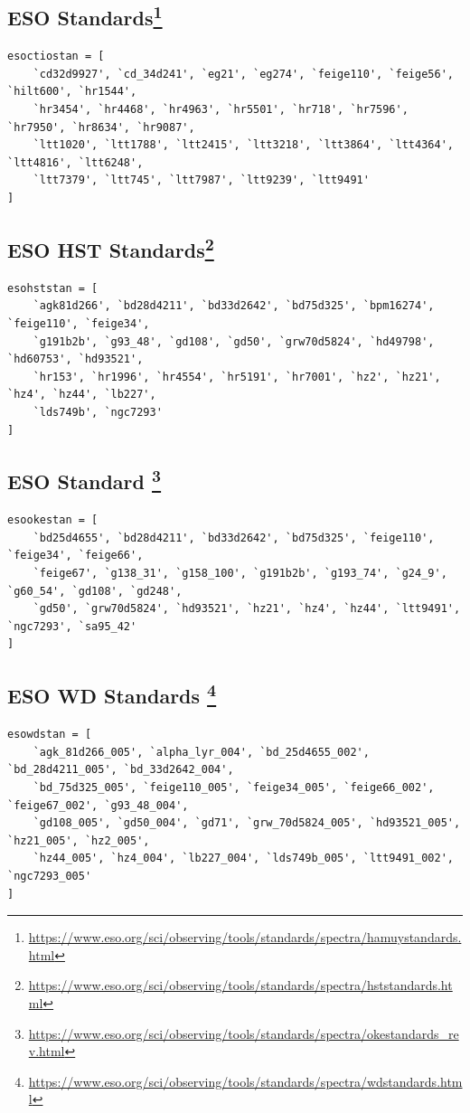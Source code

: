 \documentclass[twocolumn, linenumbers]{aastex631}
\begin{document}
\subsection*{ESO \citet{1992PASP..104..533H, 1994PASP..106..566H} Standards\footnote{\url{https://www.eso.org/sci/observing/tools/standards/spectra/hamuystandards.html}}}
\begin{verbatim}
esoctiostan = [
    `cd32d9927', `cd_34d241', `eg21', `eg274', `feige110', `feige56', `hilt600', `hr1544',
    `hr3454', `hr4468', `hr4963', `hr5501', `hr718', `hr7596', `hr7950', `hr8634', `hr9087',
    `ltt1020', `ltt1788', `ltt2415', `ltt3218', `ltt3864', `ltt4364', `ltt4816', `ltt6248',
    `ltt7379', `ltt745', `ltt7987', `ltt9239', `ltt9491'
]
\end{verbatim}

\subsection*{ESO \citet{1995AJ....110.1316B, 1996AJ....111.1743B} HST Standards\footnote{\url{https://www.eso.org/sci/observing/tools/standards/spectra/hststandards.html}}}
\begin{verbatim}
esohststan = [
    `agk81d266', `bd28d4211', `bd33d2642', `bd75d325', `bpm16274', `feige110', `feige34',
    `g191b2b', `g93_48', `gd108', `gd50', `grw70d5824', `hd49798', `hd60753', `hd93521',
    `hr153', `hr1996', `hr4554', `hr5191', `hr7001', `hz2', `hz21', `hz4', `hz44', `lb227',
    `lds749b', `ngc7293'
]
\end{verbatim}

\subsection*{ESO \citet{1990AJ.....99.1621O} Standard \footnote{\url{https://www.eso.org/sci/observing/tools/standards/spectra/okestandards_rev.html}}}

\begin{verbatim}
esookestan = [
    `bd25d4655', `bd28d4211', `bd33d2642', `bd75d325', `feige110', `feige34', `feige66',
    `feige67', `g138_31', `g158_100', `g191b2b', `g193_74', `g24_9', `g60_54', `gd108', `gd248',
    `gd50', `grw70d5824', `hd93521', `hz21', `hz4', `hz44', `ltt9491', `ngc7293', `sa95_42'
]
\end{verbatim}

\subsection*{ESO \citet{1995AJ....110.1316B} WD Standards \footnote{\url{https://www.eso.org/sci/observing/tools/standards/spectra/wdstandards.html}}}
\begin{verbatim}
esowdstan = [
    `agk_81d266_005', `alpha_lyr_004', `bd_25d4655_002', `bd_28d4211_005', `bd_33d2642_004',
    `bd_75d325_005', `feige110_005', `feige34_005', `feige66_002', `feige67_002', `g93_48_004',
    `gd108_005', `gd50_004', `gd71', `grw_70d5824_005', `hd93521_005', `hz21_005', `hz2_005',
    `hz44_005', `hz4_004', `lb227_004', `lds749b_005', `ltt9491_002', `ngc7293_005'
]
\end{verbatim}
\end{document}
